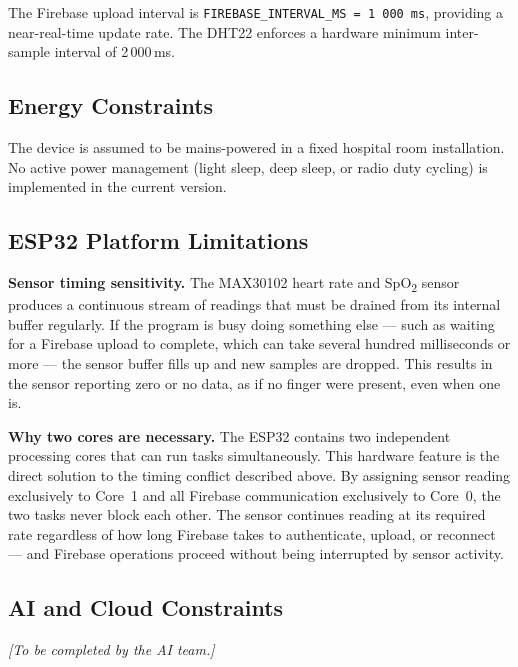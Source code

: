 The Firebase upload interval is \texttt{FIREBASE\_INTERVAL\_MS = 1\,000\,ms},
providing a near-real-time update rate.
The DHT22 enforces a hardware minimum inter-sample interval of 2\,000\,ms.


\subsection*{Energy Constraints}

The device is assumed to be mains-powered in a fixed hospital room installation.
No active power management (light sleep, deep sleep, or radio duty cycling) is
implemented in the current version.

\subsection*{ESP32 Platform Limitations}

\textbf{Sensor timing sensitivity.}
The MAX30102 heart rate and SpO\textsubscript{2} sensor produces a continuous stream
of readings that must be drained from its internal buffer regularly.
If the program is busy doing something else — such as waiting for a Firebase upload
to complete, which can take several hundred milliseconds or more — the sensor buffer
fills up and new samples are dropped.
This results in the sensor reporting zero or no data, as if no finger were present,
even when one is.

\textbf{Why two cores are necessary.}
The ESP32 contains two independent processing cores that can run tasks simultaneously.
This hardware feature is the direct solution to the timing conflict described above.
By assigning sensor reading exclusively to Core~1 and all Firebase communication
exclusively to Core~0, the two tasks never block each other.
The sensor continues reading at its required rate regardless of how long Firebase
takes to authenticate, upload, or reconnect — and Firebase operations proceed without
being interrupted by sensor activity.
\subsection*{AI and Cloud Constraints}
\begin{center}
	\textit{[To be completed by the AI team.]}
\end{center}
